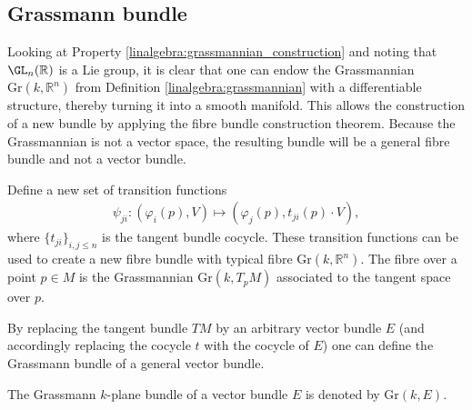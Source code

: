 \subsection{Grassmann bundle}

    Looking at Property \ref{linalgebra:grassmannian_construction} and noting that $\GL_n(\mathbb{R})$ is a Lie group, it is clear that one can endow the Grassmannian $\mathrm{Gr}(k,\mathbb{R}^n)$ from Definition \ref{linalgebra:grassmannian} with a differentiable structure, thereby turning it into a smooth manifold. This allows the construction of a new bundle by applying the fibre bundle construction theorem. Because the Grassmannian is not a vector space, the resulting bundle will be a general fibre bundle and not a vector bundle.

    \begin{construct}\label{bundle:grassmann_bundle}
        Define a new set of transition functions
        \begin{gather}
            \psi_{ji}:(\varphi_i(p),V)\mapsto(\varphi_j(p),t_{ji}(p)\cdot V),
        \end{gather}
        where $\{t_{ji}\}_{i,j\leq n}$ is the tangent bundle cocycle. These transition functions can be used to create a new fibre bundle with typical fibre $\mathrm{Gr}(k,\mathbb{R}^n)$. The fibre over a point $p\in M$ is the Grassmannian $\mathrm{Gr}(k,T_pM)$ associated to the tangent space over $p$.

        By replacing the tangent bundle $TM$ by an arbitrary vector bundle $E$ (and accordingly replacing the cocycle $t$ with the cocycle of $E$) one can define the Grassmann bundle of a general vector bundle.
    \end{construct}
    \begin{notation}
        The Grassmann $k$-plane bundle of a vector bundle $E$ is denoted by $\mathrm{Gr}(k,E)$.
    \end{notation}


